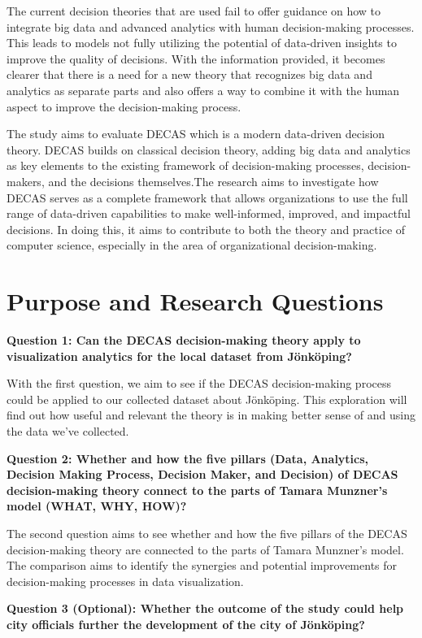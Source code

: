 The current decision theories that are used fail to offer guidance on how to integrate big data and advanced analytics with human decision-making processes. This leads to models not fully utilizing the potential of data-driven insights to improve the quality of decisions. With the information provided, it becomes clearer that there is a need for a new theory that recognizes big data and analytics as separate parts and also offers a way to combine it with the human aspect to improve the decision-making process.

The study aims to evaluate DECAS which is a modern data-driven decision theory. DECAS builds on classical decision theory, adding big data and analytics as key elements to the existing framework of decision-making processes, decision-makers, and the decisions themselves.The research aims to investigate how DECAS serves as a complete framework that allows organizations to use the full range of data-driven capabilities to make well-informed, improved, and impactful decisions. In doing this, it aims to contribute to both the theory and practice of computer science, especially in the area of organizational decision-making.

\section{Purpose and Research Questions}
\textbf{Question 1: Can the DECAS decision-making theory apply to visualization analytics for the local dataset from Jönköping?}


With the first question, we aim to see if the DECAS decision-making process could be applied to our collected dataset about Jönköping. This exploration will find out how useful and relevant the theory is in making better sense of and using the data we've collected.


\textbf{Question 2: Whether and how the five pillars (Data, Analytics, Decision Making Process, Decision Maker, and Decision) of DECAS decision-making theory connect to the parts of Tamara Munzner's model (WHAT, WHY, HOW)?}


The second question aims to see whether and how the five pillars of the DECAS decision-making theory are connected to the parts of Tamara Munzner’s model. The comparison aims to identify the synergies and potential improvements for decision-making processes in data visualization.


\textbf{Question 3 (Optional): Whether the outcome of the study could help city officials further the development of the city of Jönköping? }


